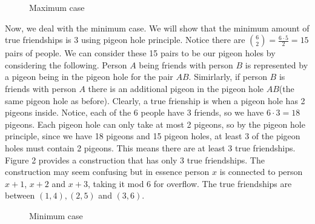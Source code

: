 \documentclass{article}
\begin{document}
\begin{enumerate}[1.]
\begin{figure}[h]
\centering
\caption{Maximum case}
\end{figure} 
Now, we deal with the minimum case. We will show that the minimum amount of true friendships is 3 using pigeon hole principle. Notice there are ${6 \choose 2} = \frac{6\cdot5}{2} = 15$ pairs of people. We can consider these 15 pairs to be our pigeon holes by considering the following. Person $A$ being friends with person $B$ is represented by a pigeon being in the pigeon hole for the pair $AB$. Simirlarly, if person $B$ is friends with person $A$ there is an additional pigeon in the pigeon hole $AB$(the same pigeon hole as before). Clearly, a true frienship is when a pigeon hole has 2 pigeons inside. Notice, each of the 6 people have 3 friends, so we have $6\cdot 3 = 18$ pigeons. Each pigeon hole can only take at most 2 pigeons, so by the pigeon hole principle, since we have 18 pigeons and 15 pigeon holes, at least 3 of the pigeon holes must contain 2 pigeons. This means there are at least 3 true friendships. Figure 2 provides a construction that has only 3 true friendships. The construction may seem confusing but in essence person $x$ is connected to person $x + 1$, $x + 2$ and $x + 3$, taking it mod 6 for overflow. The true friendships are between $(1, 4), (2, 5)$ and $(3, 6)$.
\begin{figure}[h]
\centering
\caption{Minimum case}
\end{figure} 


\end{enumerate}
\end{document}
